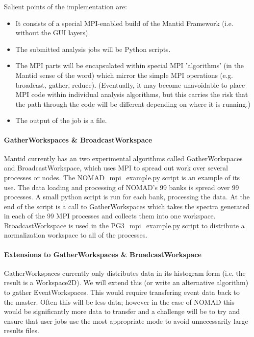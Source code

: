 Salient points of the implementation are:

\begin{itemize}
\item It consists of a special MPI-enabled build of the Mantid Framework (i.e. without the GUI layers).
\item The submitted analysis jobs will be Python scripts.
\item The MPI parts will be encapsulated within special MPI 'algorithms' (in the Mantid sense of the word) which mirror the simple MPI operations (e.g. broadcast, gather, reduce). (Eventually, it may become unavoidable to place MPI code within individual analysis algorithms, but this carries the risk that the path through the code will be different depending on where it is running.)
\item The output of the job is a file.
\end{itemize}

\paragraph{GatherWorkspaces \& BroadcastWorkspace}

Mantid currently has an two experimental algorithms called GatherWorkspaces and BroadcastWorkspace, which uses MPI to spread out work over several processes or nodes. The NOMAD\_mpi\_example.py script is an example of its use. The data loading and processing of NOMAD's 99 banks is spread over 99 processes. A small python script is run for each bank, processing the data. At the end of the script is a call to GatherWorkspaces which takes the spectra generated in each of the 99 MPI processes and collects them into one workspace. BroadcastWorkspace is used in the PG3\_mpi\_example.py script to distribute a normalization workspace to all of the processes.

\paragraph{Extensions to GatherWorkspaces \& BroadcastWorkspace}

GatherWorkspaces currently only distributes data in its histogram form (i.e. the result is a Workspace2D). We will extend this (or write an alternative algorithm) to gather EventWorkspaces. This would require transfering event data back to the master. Often this will be less data; however in the case of NOMAD this would be significantly more data to transfer and a challenge will be to try and ensure that user jobs use the most appropriate mode to avoid unnecessarily large results files.

